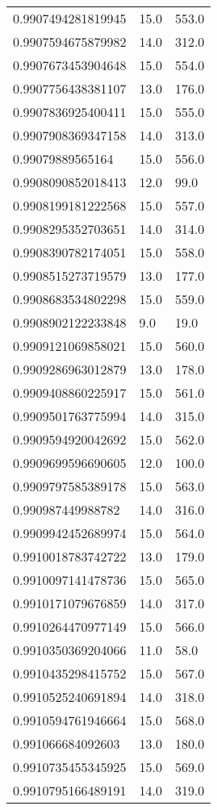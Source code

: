 \begin{center}
\begin{supertabular}[H]{p{0.30\textwidth}p{0.05\textwidth}p{0.05\textwidth}}
0.9907494281819945 & 15.0 & 553.0 \\ 
0.9907594675879982 & 14.0 & 312.0 \\ 
0.9907673453904648 & 15.0 & 554.0 \\ 
0.9907756438381107 & 13.0 & 176.0 \\ 
0.9907836925400411 & 15.0 & 555.0 \\ 
0.9907908369347158 & 14.0 & 313.0 \\ 
0.99079889565164 & 15.0 & 556.0 \\ 
0.9908090852018413 & 12.0 & 99.0 \\ 
0.9908199181222568 & 15.0 & 557.0 \\ 
0.9908295352703651 & 14.0 & 314.0 \\ 
0.9908390782174051 & 15.0 & 558.0 \\ 
0.9908515273719579 & 13.0 & 177.0 \\ 
0.9908683534802298 & 15.0 & 559.0 \\ 
0.9908902122233848 & 9.0 & 19.0 \\ 
0.9909121069858021 & 15.0 & 560.0 \\ 
0.9909286963012879 & 13.0 & 178.0 \\ 
0.9909408860225917 & 15.0 & 561.0 \\ 
0.9909501763775994 & 14.0 & 315.0 \\ 
0.9909594920042692 & 15.0 & 562.0 \\ 
0.9909699596690605 & 12.0 & 100.0 \\ 
0.9909797585389178 & 15.0 & 563.0 \\ 
0.990987449988782 & 14.0 & 316.0 \\ 
0.9909942452689974 & 15.0 & 564.0 \\ 
0.9910018783742722 & 13.0 & 179.0 \\ 
0.9910097141478736 & 15.0 & 565.0 \\ 
0.9910171079676859 & 14.0 & 317.0 \\ 
0.9910264470977149 & 15.0 & 566.0 \\ 
0.9910350369204066 & 11.0 & 58.0 \\ 
0.9910435298415752 & 15.0 & 567.0 \\ 
0.9910525240691894 & 14.0 & 318.0 \\ 
0.9910594761946664 & 15.0 & 568.0 \\ 
0.991066684092603 & 13.0 & 180.0 \\ 
0.9910735455345925 & 15.0 & 569.0 \\ 
0.9910795166489191 & 14.0 & 319.0 \\ 

\end{supertabular}
\end{center}
